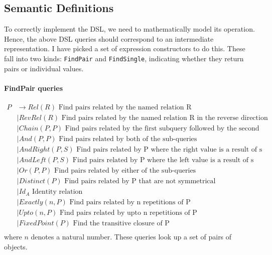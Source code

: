 \documentclass[12pt,a4paper,twoside,openright]{report}
\newcommand\codeName[1]{\texttt{#1}}
\begin{document}
\subsection{Semantic Definitions}\label{ADTDef}
To correctly implement the DSL, we need to mathematically model its operation. Hence, the above DSL queries should correspond to an intermediate representation. I have picked a set of expression constructors to do this. These fall into two kinds: \codeName{FindPair} and \codeName{FindSingle}, indicating whether they return pairs or individual values.

\paragraph{FindPair queries}
\begin{equation}
\label{PDefinition}
\begin{split}
P  &\rightarrow Rel(R) \mbox{ Find pairs related by the named relation R}\\
&\mid RevRel(R) \mbox{ Find pairs related by the named relation R in the reverse direction}\\
&\mid Chain(P, P) \mbox{   Find pairs related by the first subquery followed by the second}\\
&\mid And(P, P) \mbox{  Find pairs related by both of the sub-queries}\\
&\mid AndRight(P, S) \mbox{  Find pairs related by P where the right value is a result of s}\\
&\mid AndLeft(P, S) \mbox{  Find pairs related by P where the left value is a result of s}\\
&\mid Or(P, P) \mbox{  Find pairs related by either of the sub-queries}\\
&\mid Distinct(P) \mbox{  Find pairs related by P that are not symmetrical}\\
&\mid Id_A \mbox{ Identity relation}\\
&\mid Exactly(\mathit{n}, P) \mbox{  Find pairs related by n repetitions of P}\\
&\mid Upto(\mathit{n}, P) \mbox{  Find pairs related by upto n repetitions of P}\\
&\mid FixedPoint(P) \mbox{  Find the transitive closure of P}\\
\end{split}
\end{equation} 
where $n$ denotes a natural number. These queries look up a set of pairs of objects.\\
\end{document}
